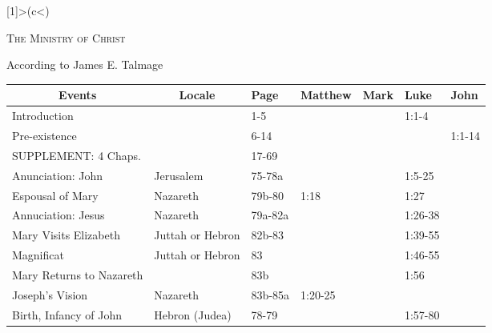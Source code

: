 
\newcolumntype{B}[1]{>{(}c<{)}}

\clearpage
\renewcommand*{\familydefault}{\sfdefault}
\begin{center}
    \Large\scshape The Ministry of Christ
\end{center}

\begin{center}
    According to James E. Talmage
\end{center}

\begin{longtable}[h]{lllllll}
    \toprule
    \multicolumn{1}{c}{Events} & \multicolumn{1}{c}{Locale} & Page & Matthew & Mark & Luke & John \\
    \midrule
\endhead
    \bottomrule
\endfoot
    \bottomrule
\endlastfoot
Introduction                       &                     & 1-5        &                 &                 & 1:1-4                & \\
Pre-existence                      &                     & 6-14       &                 &                 &                      & 1:1-14 \\
SUPPLEMENT: 4 Chaps.               &                     & 17-69      &                 &                 &                      & \\
Anunciation: John                  & Jerusalem           & 75-78a     &                 &                 & 1:5-25               & \\
Espousal of Mary                   & Nazareth            & 79b-80     & 1:18            &                 & 1:27                 & \\
Annuciation: Jesus                 & Nazareth            & 79a-82a    &                 &                 & 1:26-38              & \\
Mary Visits Elizabeth              & Juttah or Hebron    & 82b-83     &                 &                 & 1:39-55              & \\
\quad Magnificat                   & Juttah or Hebron    & 83         &                 &                 & 1:46-55              & \\
Mary Returns to Nazareth           &                     & 83b        &                 &                 & 1:56                 & \\
Joseph's Vision                    & Nazareth            & 83b-85a    & 1:20-25         &                 &                      & \\
Birth, Infancy of John             & Hebron (Judea)      & 78-79      &                 &                 & 1:57-80              & \\

\end{longtable}
